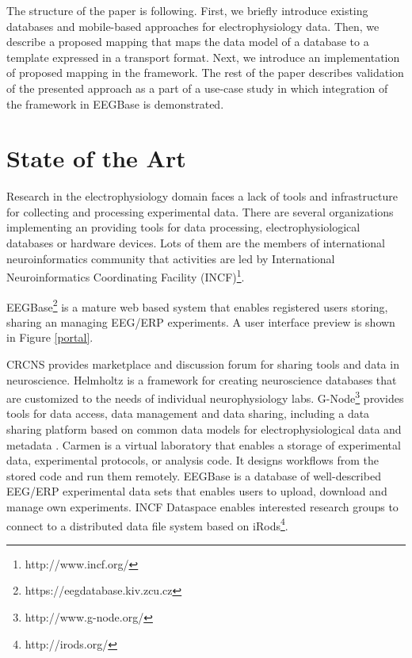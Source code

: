 \documentclass[conference]{IEEEtran}
\begin{document}
The structure of the paper is following. First, we briefly introduce existing databases and mobile-based approaches for electrophysiology data. Then, we describe a proposed mapping that maps the data model of a database to a template expressed in a transport format. Next, we introduce an implementation of proposed mapping in the framework. The rest of the paper describes validation of the presented approach as a part of a use-case study in which integration of the framework in EEGBase  is demonstrated.

\section{State of the Art}

Research in the electrophysiology domain faces a lack of tools and infrastructure for collecting and processing experimental data. There are several organizations implementing an providing tools for data processing, electrophysiological databases or hardware devices. Lots of them are the members of international neuroinformatics community that activities are led by International Neuroinformatics Coordinating Facility (INCF)\footnote{http://www.incf.org/}.

EEGBase\footnote{https://eegdatabase.kiv.zcu.cz} \cite{ISI:000306821100004} is a mature web based system that enables registered users storing, sharing an managing EEG/ERP experiments. A user interface preview is shown in Figure \ref{portal}.

CRCNS \cite{CRCNS} provides marketplace and discussion forum for sharing tools and data in neuroscience. Helmholtz \cite{10.3389/conf.fninf.2013.09.00025} is a framework for creating neuroscience databases that are customized to the needs of individual neurophysiology labs. G-Node\footnote{http://www.g-node.org/} provides tools for data access, data management and data sharing, including a data sharing platform \cite{Sobolev:2014} based on common data models for electrophysiological data and metadata \cite{Garcia:2014,10.3389/fninf.2011.00016}. Carmen \cite{fgibson:Watson2007} is a virtual laboratory that enables a storage of experimental data, experimental protocols, or analysis code. It designs workflows from the stored code and run them remotely. EEGBase is a database of well-described EEG/ERP experimental data sets that enables users to upload, download and manage own experiments. INCF Dataspace \cite{dataspace} enables interested research groups to connect to a distributed data file system based on iRods\footnote{http://irods.org/}. 
\end{document}
